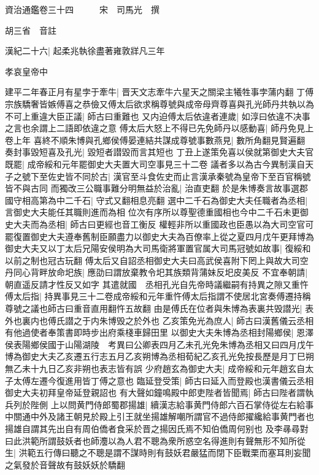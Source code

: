 資治通鑑卷三十四　　　宋　司馬光　撰

胡三省　音註

漢紀二十六|{
	起柔兆執徐盡著雍敦牂凡三年}


孝哀皇帝中

建平二年春正月有星孛于牽牛|{
	晋天文志牽牛六星天之關梁主犧牲事孛蒲内翻}
丁傅宗族驕奢皆嫉傅喜之恭儉又傅太后欲求稱尊號與成帝母齊尊喜與孔光師丹共執以為不可上重違大臣正議|{
	師古曰重難也}
又内迫傅太后依違者連歲|{
	如淳曰依違不决事之言也余謂上二語即依違之意}
傅太后大怒上不得已先免師丹以感動喜|{
	師丹免見上卷上年}
喜終不順朱博與孔鄉侯傅晏連結共謀成尊號事數燕見|{
	數所角翻見賢遍翻}
奏封事毀短喜及孔光|{
	毀短者譛毀而言其短也}
丁丑上遂策免喜以侯就第御史大夫官既罷|{
	成帝綏和元年罷御史大夫置大司空事見三十二卷}
議者多以為古今異制漢自天子之號下至佐史皆不同於古|{
	漢官至斗食佐史而止言漢承秦號為皇帝下至百官稱號皆不與古同}
而獨改三公職事難分明無益於治亂|{
	治直吏翻}
於是朱博奏言故事選郡國守相高第為中二千石|{
	守式又翻相息亮翻}
選中二千石為御史大夫任職者為丞相|{
	言御史大夫能任其職則進而為相}
位次有序所以尊聖德重國相也今中二千石未更御史大夫而為丞相|{
	師古曰更經也音工衡反}
權輕非所以重國政也臣愚以為大司空官可罷復置御史大夫遵奉舊制臣願盡力以御史大夫為百僚率上從之夏四月戊午更拜博為御史大夫又以丁太后兄陽安侯明為大司馬衛將軍置官属大司馬冠號如故事|{
	復綏和以前之制也冠古玩翻}
傅太后又自詔丞相御史大夫曰高武侯喜附下罔上與故大司空丹同心背畔放命圯族|{
	應劭曰謂放棄教令圯其族類背蒲妹反圯皮美反}
不宜奉朝請|{
	朝直遥反請才性反又如字}
其遣就國　丞相孔光自先帝時議繼嗣有持異之隙又重忤傅太后指|{
	持異事見三十二卷成帝綏和元年重忤傅太后指謂不使居北宮奏傅遷持稱尊號之議也師古曰重音直用翻忤五故翻}
由是傅氏在位者與朱博為表裏共毁譛光|{
	表外也裏内也傅氏譛之于内朱博毁之於外也}
乙亥策免光為庶人|{
	師古曰漢舊儀云丞相有他過使者奉策書即時步出府乘棧車歸田里}
以御史大夫朱博為丞相封陽鄉侯|{
	恩澤侯表陽鄉侯國于山陽湖陵　考異曰公卿表四月乙未孔光免朱博為丞相又曰四月戊午博為御史大夫乙亥遷五行志五月乙亥朔博為丞相荀紀乙亥孔光免按長歷是月丁巳朔無乙未十九日乙亥非朔也表志皆有誤}
少府趙玄為御史大夫|{
	成帝綏和元年趙玄自太子太傅左遷今復進用皆丁傅之意也}
臨延登受策|{
	師古曰延入而登殿也漢書儀云丞相御史大夫初拜皇帝延登親詔也}
有大聲如鐘鳴殿中郎吏陛者皆聞焉|{
	師古曰陛者謂執兵列於陛側}
上以問黄門侍郎蜀郡揚雄|{
	續漢志給事黄門侍郎六百石掌侍從左右給事中關通中外及諸王朝見於殿上引王就坐揚雄解嘲所謂官不過侍郎擢纔給事黄門者也揚雄自謂其先出自有周伯僑者食采於晋之揚因氏焉不知伯僑周何别也}
及李㝷尋對曰此洪範所謂鼓妖者也師灋以為人君不聰為衆所惑空名得進則有聲無形不知所從生|{
	洪範五行傳曰聽之不聰是謂不謀時則有鼓妖君嚴猛而閉下臣戰栗而塞耳則妄聞之氣發於音聲故有鼓妖妖於驕翻}
